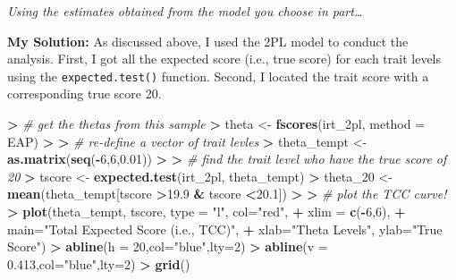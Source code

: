 \documentclass[
]{article}
\newenvironment{Shaded}{\begin{snugshade}}{\end{snugshade}}
\newcommand{\AttributeTok}[1]{\textcolor[rgb]{0.13,0.29,0.53}{#1}}
\newcommand{\CommentTok}[1]{\textcolor[rgb]{0.56,0.35,0.01}{\textit{#1}}}
\newcommand{\DecValTok}[1]{\textcolor[rgb]{0.00,0.00,0.81}{#1}}
\newcommand{\ErrorTok}[1]{\textcolor[rgb]{0.64,0.00,0.00}{\textbf{#1}}}
\newcommand{\FloatTok}[1]{\textcolor[rgb]{0.00,0.00,0.81}{#1}}
\newcommand{\FunctionTok}[1]{\textcolor[rgb]{0.13,0.29,0.53}{\textbf{#1}}}
\newcommand{\NormalTok}[1]{#1}
\newcommand{\OtherTok}[1]{\textcolor[rgb]{0.56,0.35,0.01}{#1}}
\newcommand{\SpecialCharTok}[1]{\textcolor[rgb]{0.81,0.36,0.00}{\textbf{#1}}}
\newcommand{\StringTok}[1]{\textcolor[rgb]{0.31,0.60,0.02}{#1}}
\begin{document}
\emph{Using the estimates obtained from the model you choose in
part\ldots{}}

\textbf{My Solution:} As discussed above, I used the 2PL model to
conduct the analysis. First, I got all the expected score (i.e., true
score) for each trait levels using the \texttt{expected.test()}
function. Second, I located the trait score with a corresponding true
score 20.

\begin{Shaded}
\begin{Highlighting}[]
\SpecialCharTok{\textgreater{}} \CommentTok{\# get the thetas from this sample}
\ErrorTok{\textgreater{}}\NormalTok{ theta }\OtherTok{\textless{}{-}} \FunctionTok{fscores}\NormalTok{(irt\_2pl, }\AttributeTok{method =} \StringTok{\textquotesingle{}EAP\textquotesingle{}}\NormalTok{)}
\SpecialCharTok{\textgreater{}} 
\ErrorTok{\textgreater{}} \CommentTok{\# re{-}define a vector of trait levles}
\ErrorTok{\textgreater{}}\NormalTok{ theta\_tempt }\OtherTok{\textless{}{-}} \FunctionTok{as.matrix}\NormalTok{(}\FunctionTok{seq}\NormalTok{(}\SpecialCharTok{{-}}\DecValTok{6}\NormalTok{,}\DecValTok{6}\NormalTok{,}\FloatTok{0.01}\NormalTok{))}
\SpecialCharTok{\textgreater{}} 
\ErrorTok{\textgreater{}} \CommentTok{\# find the trait level who have the true score of 20}
\ErrorTok{\textgreater{}}\NormalTok{ tscore }\OtherTok{\textless{}{-}} \FunctionTok{expected.test}\NormalTok{(irt\_2pl, theta\_tempt)}
\SpecialCharTok{\textgreater{}}\NormalTok{ theta\_20 }\OtherTok{\textless{}{-}} \FunctionTok{mean}\NormalTok{(theta\_tempt[tscore }\SpecialCharTok{\textgreater{}}\FloatTok{19.9} \SpecialCharTok{\&}\NormalTok{ tscore }\SpecialCharTok{\textless{}}\FloatTok{20.1}\NormalTok{])}
\SpecialCharTok{\textgreater{}} 
\ErrorTok{\textgreater{}} \CommentTok{\# plot the TCC curve!}
\ErrorTok{\textgreater{}} \FunctionTok{plot}\NormalTok{(theta\_tempt, tscore, }\AttributeTok{type =} \StringTok{"l"}\NormalTok{, }\AttributeTok{col=}\StringTok{"red"}\NormalTok{,}
\SpecialCharTok{+}      \AttributeTok{xlim =} \FunctionTok{c}\NormalTok{(}\SpecialCharTok{{-}}\DecValTok{6}\NormalTok{,}\DecValTok{6}\NormalTok{),}
\SpecialCharTok{+}      \AttributeTok{main=}\StringTok{"Total Expected Score (i.e., TCC)"}\NormalTok{,}
\SpecialCharTok{+}      \AttributeTok{xlab=}\StringTok{"Theta Levels"}\NormalTok{, }\AttributeTok{ylab=}\StringTok{"True Score"}\NormalTok{)}
\SpecialCharTok{\textgreater{}} \FunctionTok{abline}\NormalTok{(}\AttributeTok{h =} \DecValTok{20}\NormalTok{,}\AttributeTok{col=}\StringTok{"blue"}\NormalTok{,}\AttributeTok{lty=}\DecValTok{2}\NormalTok{)}
\SpecialCharTok{\textgreater{}} \FunctionTok{abline}\NormalTok{(}\AttributeTok{v =} \FloatTok{0.413}\NormalTok{,}\AttributeTok{col=}\StringTok{"blue"}\NormalTok{,}\AttributeTok{lty=}\DecValTok{2}\NormalTok{)}
\SpecialCharTok{\textgreater{}} \FunctionTok{grid}\NormalTok{()}
\end{Highlighting}
\end{Shaded}
\end{document}
